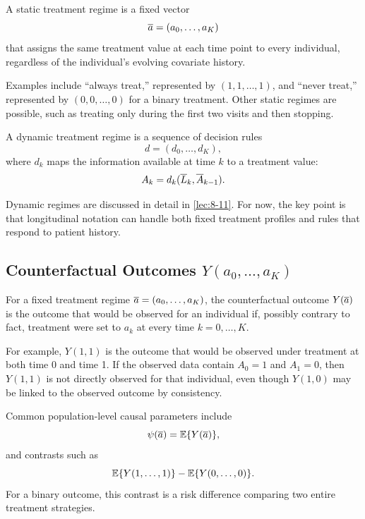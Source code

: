 \begin{definition}
A static treatment regime is a fixed vector
\[
  \overline{a}=(a_0,\ldots,a_K)
\]
that assigns the same treatment value at each time point to every individual,
regardless of the individual's evolving covariate history.
\end{definition}

Examples include ``always treat,'' represented by $(1,1,\ldots,1)$, and
``never treat,'' represented by $(0,0,\ldots,0)$ for a binary treatment.
Other static regimes are possible, such as treating only during the first two
visits and then stopping.

\begin{definition}
A dynamic treatment regime is a sequence of decision rules
\[
  d=(d_0,\ldots,d_K),
\]
where $d_k$ maps the information available at time $k$ to a treatment value:
\[
  A_k=d_k(\overline{L}_k,\overline{A}_{k-1}).
\]
\end{definition}

Dynamic regimes are discussed in detail in \cref{lec:8-11}. For now, the key
point is that longitudinal notation can handle both fixed treatment profiles and
rules that respond to patient history.

\subsection{Counterfactual Outcomes $Y(a_0,\ldots,a_K)$}

\begin{definition}
For a fixed treatment regime $\overline{a}=(a_0,\ldots,a_K)$, the counterfactual
outcome $Y(\overline{a})$ is the outcome that would be observed for an individual if,
possibly contrary to fact, treatment were set to $a_k$ at every time
$k=0,\ldots,K$.
\end{definition}

For example, $Y(1,1)$ is the outcome that would be observed under treatment at
both time 0 and time 1. If the observed data contain $A_0=1$ and $A_1=0$, then
$Y(1,1)$ is not directly observed for that individual, even though $Y(1,0)$ may
be linked to the observed outcome by consistency.

Common population-level causal parameters include
\[
  \psi(\overline{a})=\mathbb{E}\{Y(\overline{a})\},
\]
and contrasts such as
\[
  \mathbb{E}\{Y(1,\ldots,1)\}-\mathbb{E}\{Y(0,\ldots,0)\}.
\]
For a binary outcome, this contrast is a risk difference comparing two entire
treatment strategies.

